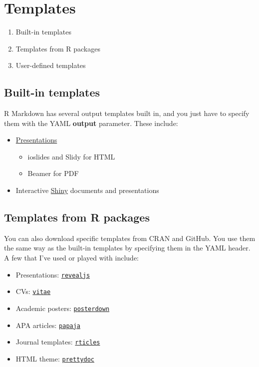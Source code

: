 \documentclass[
  openany]{book}
\providecommand{\tightlist}{%
  \setlength{\itemsep}{0pt}\setlength{\parskip}{0pt}}
\begin{document}
\hypertarget{template}{%
\chapter{Templates}\label{template}}

\begin{enumerate}
\def\labelenumi{\arabic{enumi}.}
\tightlist
\item
  Built-in templates
\item
  Templates from R packages
\item
  User-defined templates
\end{enumerate}

\hypertarget{built-in-templates}{%
\section{Built-in templates}\label{built-in-templates}}

R Markdown has several output templates built in, and you just have to specify them with the YAML \textbf{output} parameter. These include:

\begin{itemize}
\tightlist
\item
  \href{https://rmarkdown.rstudio.com/lesson-11.html}{Presentations}

  \begin{itemize}
  \tightlist
  \item
    ioslides and Slidy for HTML
  \item
    Beamer for PDF
  \end{itemize}
\item
  Interactive \href{https://bookdown.org/yihui/rmarkdown/shiny-documents.html}{Shiny} documents and presentations
\end{itemize}

\hypertarget{packages}{%
\section{Templates from R packages}\label{packages}}

You can also download specific templates from CRAN and GitHub. You use them the same way as the built-in templates by specifying them in the YAML header. A few that I've used or played with include:

\begin{itemize}
\tightlist
\item
  Presentations: \href{https://cran.r-project.org/web/packages/revealjs/index.html}{\texttt{revealjs}}
\item
  CVs: \href{https://github.com/mitchelloharawild/vitae}{\texttt{vitae}}
\item
  Academic posters: \href{https://github.com/brentthorne/posterdown}{\texttt{posterdown}}
\item
  APA articles: \href{https://github.com/crsh/papaja}{\texttt{papaja}}
\item
  Journal templates: \href{https://bookdown.org/yihui/rmarkdown/rticles-templates.html}{\texttt{rticles}}
\item
  HTML theme: \href{https://github.com/yixuan/prettydoc}{\texttt{prettydoc}}
\end{itemize}
\end{document}
